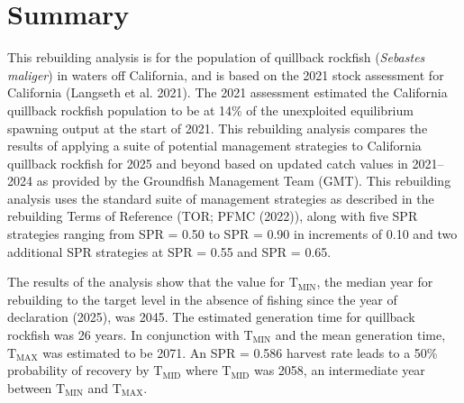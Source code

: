 \documentclass[11pt,
  letterpaper,
]{article}
\begin{document}
\pagestyle{plain}  %
\renewcommand*{\thefootnote}{\arabic{footnote}}  %
\setcounter{footnote}{0}  %
\renewcommand{\headrulewidth}{0.5pt}
\renewcommand{\footrulewidth}{0.5pt}

\newcommand{\lt}{\ensuremath <}
\newcommand{\gt}{\ensuremath >}

\pagebreak
{}
\setcounter{page}{1}

\renewcommand{\thetable}{\roman{table}}
\renewcommand{\thefigure}{\roman{figure}}

\setlength\parskip{0.5em plus 0.1em minus 0.2em}

\pagebreak

\hypertarget{summary}{%
\section*{Summary}\label{summary}}

This rebuilding analysis is for the population of quillback rockfish (\emph{Sebastes maliger}) in waters off California, and is based on the 2021 stock assessment for California (Langseth et al. 2021). The 2021 assessment estimated the California quillback rockfish population to be at 14\% of the unexploited equilibrium spawning output at the start of 2021. This rebuilding analysis compares the results of applying a suite of potential management strategies to California quillback rockfish for 2025 and beyond based on updated catch values in 2021--2024 as provided by the Groundfish Management Team (GMT). This rebuilding analysis uses the standard suite of management strategies as described in the rebuilding Terms of Reference (TOR; PFMC (2022)), along with five SPR strategies ranging from SPR = 0.50 to SPR = 0.90 in increments of 0.10 and two additional SPR strategies at SPR = 0.55 and SPR = 0.65.

The results of the analysis show that the value for \(\text{T}_\text{MIN}\), the median year for rebuilding to the target level in the absence of fishing since the year of declaration (2025), was 2045. The estimated generation time for quillback rockfish was 26 years. In conjunction with \(\text{T}_\text{MIN}\) and the mean generation time, \(\text{T}_\text{MAX}\) was estimated to be 2071. An SPR = 0.586 harvest rate leads to a 50\% probability of recovery by \(\text{T}_\text{MID}\) where \(\text{T}_\text{MID}\) was 2058, an intermediate year between \(\text{T}_\text{MIN}\) and \(\text{T}_\text{MAX}\).
\end{document}
